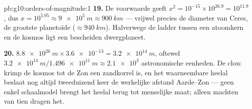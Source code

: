 \begin{solution}{pb:g10:orders-of-magnitude:1}
\textbf{19.} De voorwaarde geeft
$x^{2} = 10^{-15} \times 10^{26.9} = 10^{11.9}$, dus
$x = 10^{5.95} \approx \qty{9e5}{m} \approx \qty{900}{km}$ --- vrijwel
precies de diameter van Ceres, de grootste planetoïde
($\approx \qty{940}{km}$). Halverwege de ladder tussen een atoomkern
en de kosmos ligt een bescheiden dwergplaneet.

\textbf{20.} $\qty{8.8e26}{m} \times \num{3.6e-13} = \qty{3.2e14}{m}$,
oftewel $\qty{3.2e14}{m}/\qty{1.496e11}{m} \approx \num{2.1e3}$
astronomische eenheden. De clou: krimp de kosmos tot de Zon een
zandkorrel is, en het waarneembare heelal beslaat nog altijd tweeduizend
keer de werkelijke afstand Aarde--Zon --- geen enkel schaalmodel brengt
het heelal terug tot menselijke maat; alleen machten van tien dragen
het.
\end{solution}
